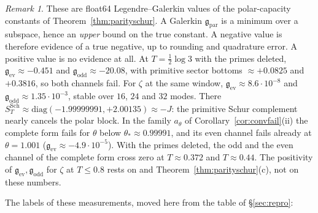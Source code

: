\documentclass[11pt]{amsart}
\theoremstyle{definition}
\theoremstyle{remark}
\newtheorem{remark}[theorem]{Remark}
\begin{document}
\begin{remark}\label{rem:polarcapdiag}
These are float64 Legendre--Galerkin values of the polar-capacity constants of Theorem~\ref{thm:parityschur}.
A Galerkin $\mathfrak g_{\mathrm{par}}$ is a minimum over a subspace, hence an \emph{upper} bound on the true constant.
A negative value is therefore evidence of a true negative, up to rounding and quadrature error. A positive
value is no evidence at all. At $T=\frac12\log3$ with the primes deleted, $\mathfrak g_{\mathrm{ev}}\approx-0.451$ and
$\mathfrak g_{\mathrm{odd}}\approx-20.08$, with primitive sector bottoms $\approx+0.0825$ and $+0.3816$, so both channels
fail. For $\zeta$ at the same window, $\mathfrak g_{\mathrm{ev}}\approx8.6\cdot10^{-8}$ and $\mathfrak g_{\mathrm{odd}}\approx1.35\cdot10^{-3}$,
stable over $16$, $24$ and $32$ modes. There $S^{\mathrm{Sch}}_T\approx\mathrm{diag}(-1.99999991,+2.00135)\approx-J$:
the primitive Schur complement nearly cancels the polar block. In the family $a_\theta$ of
Corollary~\ref{cor:convfail}(ii) the complete form fails for $\theta$ below $\theta_*\approx0.99991$, and its
even channel fails already at $\theta=1.001$ ($\mathfrak g_{\mathrm{ev}}\approx-4.9\cdot10^{-5}$). With the primes
deleted, the odd and the even channel of the complete form cross zero at $T\approx0.372$ and $T\approx0.44$. The
positivity of $\mathfrak g_{\mathrm{ev}},\mathfrak g_{\mathrm{odd}}$ for $\zeta$ at $T\le0.8$ rests on \cite{Zhu2026} and
Theorem~\ref{thm:parityschur}(c), not on these numbers.
\end{remark}

The labels of these measurements, moved here from the table of \S\ref{sec:repro}:
\end{document}
